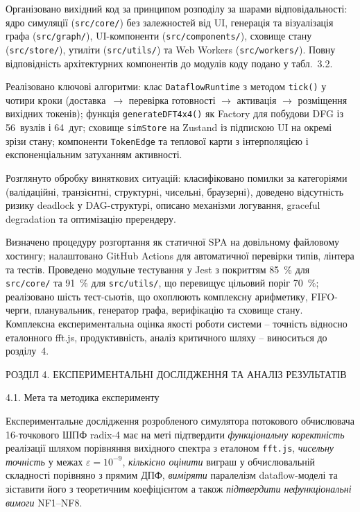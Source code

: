 \documentclass[
]{article}
\begin{document}
Організовано вихідний код за принципом розподілу за шарами
відповідальності: ядро симуляції
(\texttt{src}\texttt{/}\texttt{core}\texttt{/}) без залежностей від UI,
генерація та візуалізація графа
(\texttt{src}\texttt{/}\texttt{graph}\texttt{/}), UI-компоненти
(\texttt{src}\texttt{/}\texttt{components}\texttt{/}), сховище стану
(\texttt{src}\texttt{/}\texttt{store}\texttt{/}), утиліти
(\texttt{src}\texttt{/}\texttt{utils}\texttt{/}) та Web Workers
(\texttt{src}\texttt{/}\texttt{workers}\texttt{/}). Повну відповідність
архітектурних компонентів до модулів коду подано у табл.~3.2.

Реалізовано ключові алгоритми: клас \texttt{DataflowRuntime} з методом
\texttt{tick}\texttt{()} у чотири кроки (доставка~\(\rightarrow\)
перевірка готовності \(\rightarrow\) активація \(\rightarrow\)
розміщення вихідних токенів); функція \texttt{generateDFT4x4()} як
Factory для побудови DFG із 56~вузлів і 64~дуг; сховище
\texttt{simStore} на Zustand із підпискою UI на окремі зрізи стану;
компоненти \texttt{TokenEdge} та теплової карти з інтерполяцією і
експоненціальним затуханням активності.

Розглянуто обробку виняткових ситуацій: класифіковано помилки за
категоріями (валідаційні, транзієнтні, структурні, чисельні, браузерні),
доведено відсутність ризику deadlock у DAG-структурі, описано механізми
логування, graceful degradation та оптимізацію пререндеру.

Визначено процедуру розгортання як статичної SPA на довільному файловому
хостингу; налаштовано GitHub Actions для автоматичної перевірки типів,
лінтера та тестів. Проведено модульне тестування у Jest з покриттям
85~\% для \texttt{src}\texttt{/}\texttt{core}\texttt{/} та 91~\% для
\texttt{src}\texttt{/}\texttt{utils}\texttt{/}, що перевищує цільовий
поріг 70~\%; реалізовано шість тест-сьютів, що охоплюють комплексну
арифметику, FIFO-черги, планувальник, генератор графа, верифікацію та
сховище стану. Комплексна експериментальна оцінка якості роботи системи
-- точність відносно еталонного fft.js, продуктивність, аналіз
критичного шляху -- виноситься до розділу~4.

\protect{}\label{_Toc229681164}{}РОЗДІЛ 4. ЕКСПЕРИМЕНТАЛЬНІ
ДОСЛІДЖЕННЯ ТА АНАЛІЗ РЕЗУЛЬТАТІВ

\protect{}\label{_Toc229681165}{}4.1. Мета та методика
експерименту

Експериментальне дослідження розробленого симулятора потокового
обчислювача 16-точкового ШПФ radix-4 має на меті підтвердити
\emph{функціональну коректність} реалізації шляхом порівняння вихідного
спектра з еталоном \texttt{fft.js}, \emph{чисельну точність} у межах
\(\varepsilon = 10^{- 9}\), \emph{кількісно оцінити} виграш у
обчислювальній складності порівняно з прямим ДПФ, \emph{виміряти}
паралелізм dataflow-моделі та зіставити його з теоретичним коефіцієнтом
а також \emph{підтвердити нефункціональні вимоги} NF1--NF8.
\end{document}
